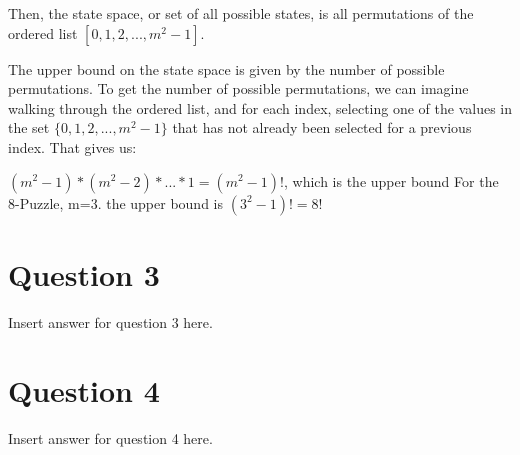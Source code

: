 \documentclass{article}
\begin{document}
    Then, the state space, or set of all possible states, is all permutations of the ordered list $[0,1,2,...,m^2-1]$.\newline
    
    The upper bound on the state space is given by the number of possible permutations. To get the number of possible permutations, we can imagine walking through the ordered list, and for each index, selecting one of the values in the set $\{0, 1, 2, ..., m^2-1\}$ that has not already been selected for a previous index. That gives us:\newline
    
    $(m^2-1) * (m^2-2) * ... * 1 = (m^2 - 1)!$, which is the upper bound
    \newline
    For the 8-Puzzle, m=3. the upper bound is $(3^2 - 1)! = 8!$
    
    \newpage
    \section*{Question 3}
    Insert answer for question 3 here.
    \newpage
    \section*{Question 4}
    Insert answer for question 4 here.
\end{document}
